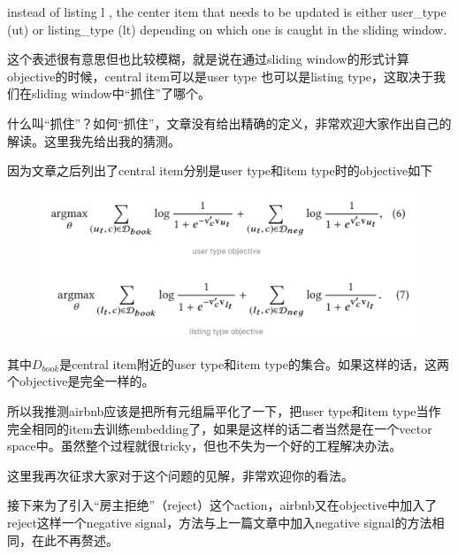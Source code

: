 \documentclass[12pt]{article}
\begin{document}
\begin{framed}
instead of listing l , the center item that needs to be updated is either user\_type (ut) or listing\_type (lt) depending on which one is caught in the sliding window.
\end{framed}

这个表述很有意思但也比较模糊，就是说在通过sliding window的形式计算objective的时候，central item可以是user type 也可以是listing type，这取决于我们在sliding window中“抓住”了哪个。

什么叫“抓住”？如何“抓住”，文章没有给出精确的定义，非常欢迎大家作出自己的解读。这里我先给出我的猜测。

因为文章之后列出了central item分别是user type和item type时的objective如下

\begin{figure}[H]
    \centering
    \includegraphics[width=1\textwidth]{fig/Airbnb_Click_Objetive5.png}
\end{figure}

其中$D_{book}$是central item附近的user type和item type的集合。如果这样的话，这两个objective是完全一样的。

所以我推测airbnb应该是把所有元组扁平化了一下，把user type和item type当作完全相同的item去训练embedding了，如果是这样的话二者当然是在一个vector space中。虽然整个过程就很tricky，但也不失为一个好的工程解决办法。

这里我再次征求大家对于这个问题的见解，非常欢迎你的看法。

接下来为了引入“房主拒绝”（reject）这个action，airbnb又在objective中加入了reject这样一个negative signal，方法与上一篇文章中加入negative signal的方法相同，在此不再赘述。
\end{document}
